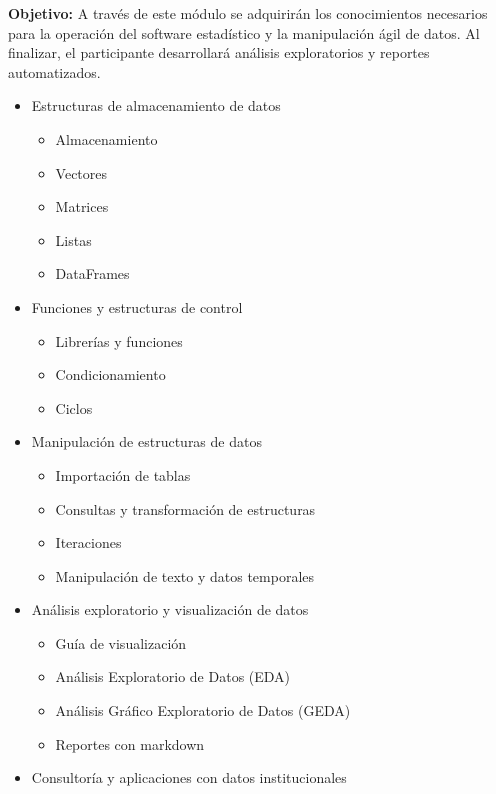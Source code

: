 \documentclass[
]{book}
\providecommand{\tightlist}{%
  \setlength{\itemsep}{0pt}\setlength{\parskip}{0pt}}
\begin{document}
\textbf{Objetivo:} A través de este módulo se adquirirán los conocimientos necesarios para la operación del software estadístico y la manipulación ágil de datos. Al finalizar, el participante desarrollará análisis exploratorios y reportes automatizados.

\begin{itemize}
\item
  Estructuras de almacenamiento de datos

  \begin{itemize}
  \tightlist
  \item
    Almacenamiento
  \item
    Vectores
  \item
    Matrices
  \item
    Listas
  \item
    DataFrames
  \end{itemize}
\item
  Funciones y estructuras de control

  \begin{itemize}
  \tightlist
  \item
    Librerías y funciones
  \item
    Condicionamiento
  \item
    Ciclos
  \end{itemize}
\item
  Manipulación de estructuras de datos

  \begin{itemize}
  \tightlist
  \item
    Importación de tablas
  \item
    Consultas y transformación de estructuras
  \item
    Iteraciones
  \item
    Manipulación de texto y datos temporales
  \end{itemize}
\item
  Análisis exploratorio y visualización de datos

  \begin{itemize}
  \tightlist
  \item
    Guía de visualización
  \item
    Análisis Exploratorio de Datos (EDA)
  \item
    Análisis Gráfico Exploratorio de Datos (GEDA)
  \item
    Reportes con markdown
  \end{itemize}
\item
  Consultoría y aplicaciones con datos institucionales
\end{itemize}
\end{document}
